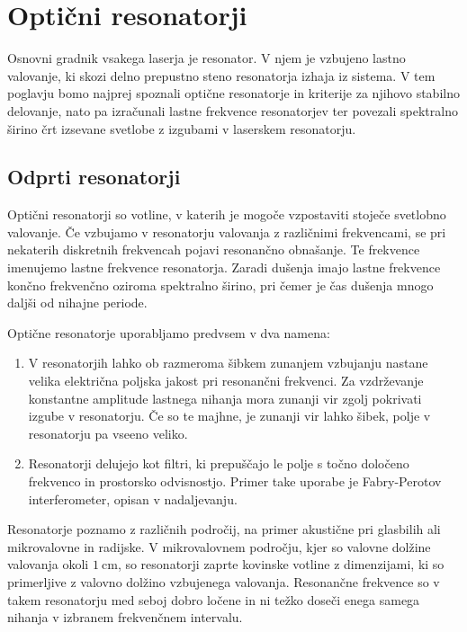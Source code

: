 
\chapter{Optični resonatorji}
Osnovni gradnik vsakega laserja je resonator. V njem je vzbujeno lastno valovanje,
ki skozi delno prepustno steno resonatorja izhaja iz sistema. V tem poglavju bomo 
najprej spoznali optične resonatorje in kriterije za njihovo stabilno delovanje,
nato pa izračunali lastne frekvence resonatorjev ter povezali spektralno širino črt
izsevane svetlobe z izgubami v laserskem resonatorju. 

\section{Odprti resonatorji}
Optični resonatorji so votline, v katerih je mogoče 
vzpostaviti stoječe svetlobno valovanje. Če vzbujamo v resonatorju valovanja z 
različnimi frekvencami, se pri nekaterih diskretnih frekvencah pojavi resonančno
obnašanje. Te frekvence imenujemo lastne frekvence
resonatorja. Zaradi dušenja imajo lastne frekvence končno frekvenčno oziroma spektralno 
širino, pri čemer je čas dušenja mnogo daljši od nihajne periode. 

Optične resonatorje uporabljamo predvsem v dva namena:
\begin{enumerate}
\item V resonatorjih lahko ob razmeroma šibkem zunanjem vzbujanju nastane velika
električna poljska jakost pri resonančni frekvenci. Za vzdrževanje
konstantne amplitude lastnega nihanja mora zunanji vir zgolj pokrivati izgube
v resonatorju. Če so te majhne, je zunanji vir lahko šibek, polje
v resonatorju pa vseeno veliko.\\
\item Resonatorji delujejo kot filtri, ki prepuščajo le polje s točno  
določeno frekvenco in prostorsko odvisnostjo. Primer take uporabe je 
Fabry-Perotov interferometer, opisan 
v nadaljevanju. 
\end{enumerate}

Resonatorje poznamo z različnih področij, na primer akustične pri glasbilih ali 
mikrovalovne in radijske. V mikrovalovnem področju, kjer so valovne dolžine valovanja
okoli $1~\si{\centi\metre}$, 
so resonatorji zaprte kovinske votline z dimenzijami, ki so primerljive z 
valovno dolžino vzbujenega valovanja. Resonančne frekvence so v takem resonatorju 
med seboj dobro ločene in ni težko doseči enega samega nihanja v izbranem 
frekvenčnem intervalu.

